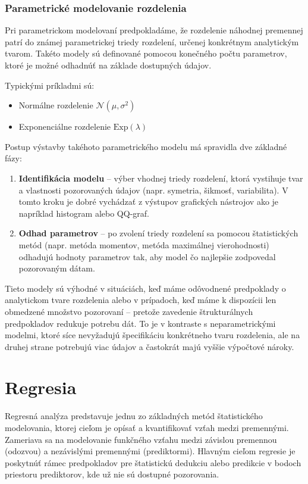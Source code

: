 \subsubsection{Parametrické modelovanie rozdelenia}\label{subsubsec:parametric_models}

Pri parametrickom modelovaní predpokladáme, že rozdelenie náhodnej premennej patrí do známej parametrickej triedy rozdelení, určenej konkrétnym analytickým tvarom. Takéto modely sú definované pomocou konečného počtu parametrov, ktoré je možné odhadnúť na základe dostupných údajov.

Typickými príkladmi sú:
\begin{itemize}
  \item Normálne rozdelenie $\mathcal{N}(\mu, \sigma^2)$
  \item Exponenciálne rozdelenie $\text{Exp}(\lambda)$
\end{itemize}

Postup výstavby takéhoto parametrického modelu má spravidla dve základné fázy:
\begin{enumerate}
  \item \textbf{Identifikácia modelu} – výber vhodnej triedy rozdelení, ktorá vystihuje tvar a vlastnosti pozorovaných údajov (napr. symetria, šikmosť, variabilita). V tomto kroku je dobré vychádzať z výstupov grafických nástrojov ako je napríklad histogram alebo QQ-graf.
  
  \item \textbf{Odhad parametrov} – po zvolení triedy rozdelení sa pomocou štatistických metód (napr. metóda momentov, metóda maximálnej vierohodnosti) odhadujú hodnoty parametrov tak, aby model čo najlepšie zodpovedal pozorovaným dátam.
\end{enumerate}

Tieto modely sú výhodné v situáciách, keď máme odôvodnené predpoklady o analytickom tvare rozdelenia alebo v prípadoch, keď máme k dispozícii len obmedzené množstvo pozorovaní – pretože zavedenie štrukturálnych predpokladov redukuje potrebu dát. To je v kontraste s neparametrickými modelmi, ktoré síce nevyžadujú špecifikáciu konkrétneho tvaru rozdelenia, ale na druhej strane potrebujú viac údajov a častokrát majú vyššie výpočtové nároky.

\section{Regresia}\label{sec:regresia}

Regresná analýza predstavuje jednu zo základných metód štatistického modelovania, ktorej cieľom je opísať a kvantifikovať vzťah medzi premennými. Zameriava sa na modelovanie funkčného vzťahu medzi závislou premennou (odozvou) a nezávislými premennými (prediktormi). Hlavným cieľom regresie je poskytnúť rámec predpokladov pre štatistickú dedukciu alebo  predikcie v bodoch priestoru prediktorov, kde už nie sú dostupné pozorovania.


